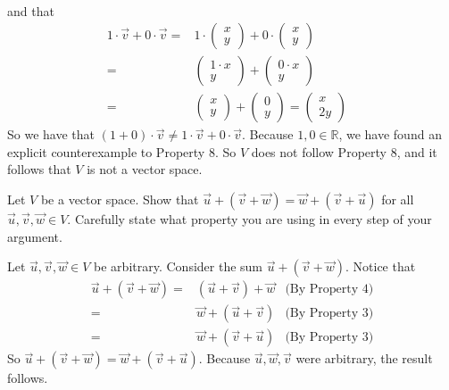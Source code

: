 \documentclass[12pt]{article}
\newenvironment{problem}[2][Problem]
{
	\begin{trivlist} 
		\item[\hskip \labelsep {\bfseries #1 #2:}]
	}
{
	\end{trivlist}
	}
\newenvironment{solution}[1][Solution]
{
	\begin{trivlist} 
		\item[\hskip \labelsep {\itshape #1:}]
	}
	{
	\end{trivlist}
}
\begin{document}
\begin{problem}{2}
\begin{solution}
\begin{align*}
\end{align*}
and that 
\begin{align*}
1\cdot \vec{v} + 0\cdot \vec{v} =& 1\cdot  \begin{pmatrix}x\\y\end{pmatrix} +  0\cdot \begin{pmatrix}x\\y\end{pmatrix} &\\
=&  \begin{pmatrix}1\cdot x\\y\end{pmatrix} +  \begin{pmatrix}0\cdot x\\y\end{pmatrix} &\\
=&  \begin{pmatrix}x\\y\end{pmatrix} +  \begin{pmatrix}0\\y\end{pmatrix} =  \begin{pmatrix}x\\2y\end{pmatrix} &
\end{align*}
So we have that $(1+0)\cdot \vec{v} \neq 1\cdot \vec{v} + 0\cdot \vec{v}$. Because $1,0 \in \mathbb{R}$, we have found an explicit counterexample to Property 8. So $V$ does not follow Property 8, and it follows that $V$ is not a vector space.
\end{solution}
\end{problem}






\newpage
\begin{problem}{3}
Let $V$ be a vector space. Show that $\vec{u}+(\vec{v}+\vec{w}) = \vec{w}+(\vec{v}+\vec{u})$ for all $\vec{u},\vec{v},\vec{w} \in V$. Carefully state what property you are using in every step of your argument. 
\noindent
\newline
\newline
\begin{solution}
Let $\vec{u},\vec{v},\vec{w} \in V$ be arbitrary. Consider the sum $\vec{u} +(\vec{v}+\vec{w})$. Notice that
\begin{align*}
\vec{u} +(\vec{v}+\vec{w}) =& (\vec{u} +\vec{v})+\vec{w} & \text{(By Property 4)}\\
=& \vec{w}+ (\vec{u} +\vec{v}) & \text{(By Property 3)} \\
=& \vec{w}+ (\vec{v} +\vec{u}) & \text{(By Property 3)}
\end{align*}
So $\vec{u} +(\vec{v}+\vec{w}) = \vec{w}+ (\vec{v} +\vec{u})$. Because $\vec{u},\vec{w},\vec{v}$ were arbitrary, the result follows.
\end{solution}
\end{problem}
\end{document}

